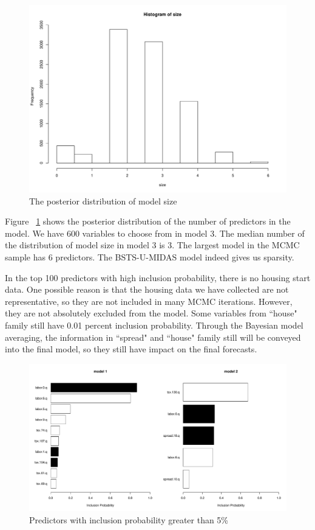 \begin{figure}[h]
	\centering
	\includegraphics[width=0.5\linewidth]{Figures/size}
	\caption{The posterior distribution of  model size}
	\label{fig:size}
\end{figure}

Figure ~\ref{fig:size} shows the posterior distribution of the number of predictors in the model. We have 600 variables  to choose from in model 3. The median number of the distribution of model size in model 3 is 3. The largest model in the MCMC sample has 6 predictors. The BSTS-U-MIDAS model indeed gives us sparsity.  
 
In the top 100 predictors with high inclusion probability, there is no housing start data. One possible reason is that the housing data we have collected are not representative, so they are not included in many MCMC iterations. However, they are not absolutely excluded from the model. Some variables from ``house" family still have 0.01 percent inclusion probability. Through the Bayesian model averaging, the information in ``spread" and ``house" family still will be conveyed into the final model, so they still have impact on the final forecasts.


\begin{figure}[h]
\centering
\includegraphics[width=0.7\linewidth]{Figures/Coefficients_model1_2}
\caption{Predictors with inclusion probability greater than 5\%}
\label{fig:Coefficients_model1_2}
\end{figure}



